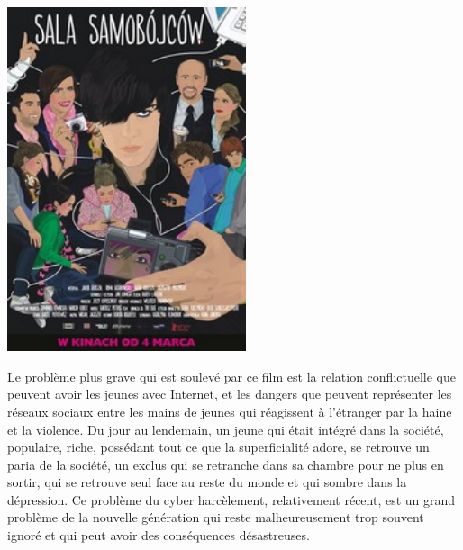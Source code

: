 \documentclass[12pt]{amsart}
\begin{document}
\begin{multicols}{2}
\begingroup
\centering

\includegraphics[width=7cm]{sala.jpg}
\endgroup


Le problème plus grave qui est soulevé par ce film est la relation conflictuelle que peuvent avoir les jeunes avec Internet, et les dangers que peuvent représenter les réseaux sociaux entre les mains de jeunes qui réagissent à l’étranger par la haine et la violence. Du jour au lendemain, un jeune qui était intégré dans la société, populaire, riche, possédant tout ce que la superficialité adore, se retrouve un paria de la société, un exclus qui se retranche dans sa chambre pour ne plus en sortir, qui se retrouve seul face au reste du monde et qui sombre dans la dépression. Ce problème du cyber harcèlement, relativement récent, est un grand problème de la nouvelle génération qui reste malheureusement trop souvent ignoré et qui peut avoir des conséquences désastreuses. 


\end{multicols}
\end{document}
